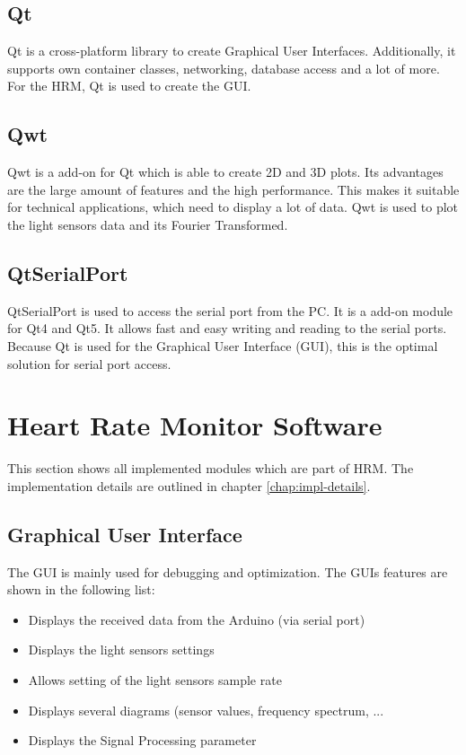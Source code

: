 \documentclass[oneside, notitlepage]{scrreprt}
\begin{document}
\subsection{Qt}
Qt is a cross-platform library to create Graphical User Interfaces. Additionally, it supports own container classes, networking, database access and a lot of more. For the HRM, Qt is used to create the GUI.

\subsection{Qwt}
Qwt is a add-on for Qt which is able to create 2D and 3D plots. Its advantages are the large amount of features and the high performance. This makes it suitable for technical applications, which need to display a lot of data. Qwt is used to plot the light sensors data and its Fourier Transformed.

\subsection{QtSerialPort}
QtSerialPort is used to access the serial port from the PC. It is a add-on module for Qt4 and Qt5. It allows fast and easy writing and reading to the serial ports. Because Qt is used for the Graphical User Interface (GUI), this is the optimal solution for serial port access.

\section{Heart Rate Monitor Software}
This section shows all implemented modules which are part of HRM. The implementation details are outlined in chapter \ref{chap:impl-details}.

\subsection{Graphical User Interface}
The GUI is mainly used for debugging and optimization. The GUIs features are shown in the following list:

\begin{itemize}
	\item{Displays the received data from the Arduino (via serial port)}
	\item{Displays the light sensors settings}
	\item{Allows setting of the light sensors sample rate}
	\item{Displays several diagrams (sensor values, frequency spectrum, ...}
	\item{Displays the Signal Processing parameter}
\end{itemize}
\end{document}
